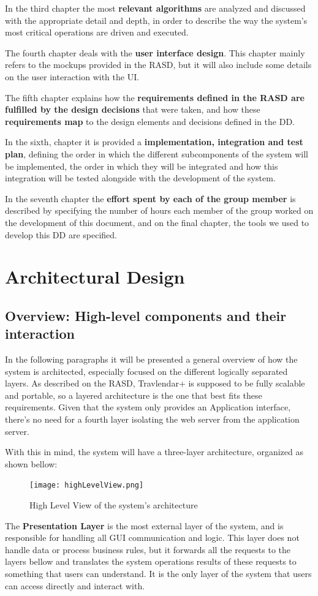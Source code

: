 \documentclass[12pt]{article}
\begin{document}
In the third chapter the most \textbf{relevant algorithms} are analyzed and discussed with the appropriate detail and depth, in order to describe the way the system's most critical operations are driven and executed.

The fourth chapter deals with the \textbf{user interface design}. This chapter mainly refers to the mockups provided in the RASD, but it will also include some details on the user interaction with the UI.

The fifth chapter explains how the \textbf{requirements defined in the RASD are fulfilled by the design decisions} that were taken, and how these \textbf{requirements map} to the design elements and decisions defined in the DD.

In the sixth, chapter it is provided a \textbf{implementation, integration and test plan}, defining the order in which the different subcomponents of the system will be implemented, the order in which they will be integrated and how this integration will be tested alongside with the development of the system.

In the seventh chapter the \textbf{effort spent by each of the group member} is described by specifying the number of hours each member of the group worked on the development of this document, and on the final chapter, the tools we used to develop this DD are specified.


\section{Architectural Design}

\subsection{Overview: High-level components and their interaction}

In the following paragraphs it will be presented a general overview of how the system is architected, especially focused on the different logically separated layers.
As described on the RASD, Travlendar+ is supposed to be fully scalable and portable, so a layered architecture is the one that best fits these requirements. Given that the system only provides an Application interface, there's no need for a fourth layer isolating the web server from the application server. 

With this in mind, the system will have a three-layer architecture, organized as shown bellow:
\begin{figure}[H]
    \centering
    \texttt{[image: highLevelView.png]}
    \caption{High Level View of the system's architecture}
    \label{fig:highLevelView}
\end{figure}
The \textbf{Presentation Layer} is the most external layer of the system, and is responsible for handling all GUI communication and logic. This layer does not handle data or process business rules, but it forwards all the requests to the layers bellow and translates the system operations results of these requests to something that users can understand. It is the only layer of the system that users can access directly and interact with.
\end{document}
